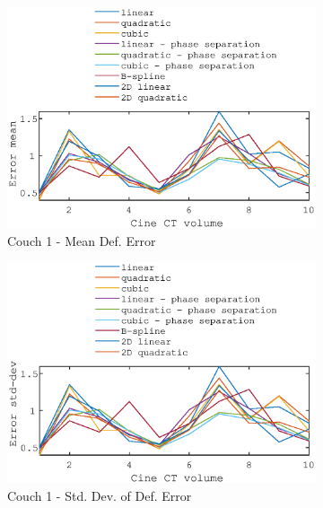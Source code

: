 \documentclass[11pt,a4paper,oneside]{report}
\begin{document}
\begin{figure}[H]
  \hspace*{-2em}
  \begin{subfigure}[b]{0.5\textwidth}
    \includegraphics[width=\textwidth, trim=0 0 0 \trimval,clip=true]{figures/task4/def_mean_error_couch1.eps}
    \caption{Couch 1 - Mean Def. Error}
  \end{subfigure}%
  \begin{subfigure}[b]{0.5\textwidth}
    \includegraphics[width=\textwidth, trim=0 0 0 \trimval,clip=true]{figures/task4/def_stddev_error_couch1.eps}
    \caption{Couch 1 - Std. Dev. of Def. Error}
  \end{subfigure}
  ~
    \hspace*{-2em}
  \begin{subfigure}[b]{0.5\textwidth}

\end{subfigure}
\end{figure}
\end{document}
